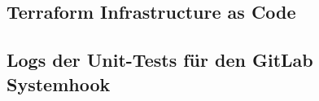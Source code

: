 \subsection{Terraform Infrastructure as Code}
\label{app:terraform}

\clearpage



\clearpage

\subsection{Logs der Unit-Tests für den GitLab Systemhook}
\label{app:hookTest}

\clearpage